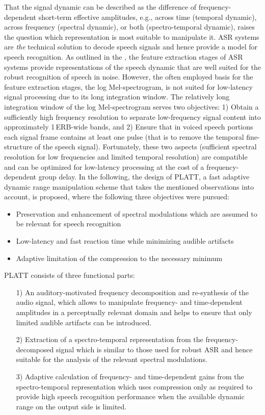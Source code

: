 \documentclass[10pt,a4paper,twocolumn]{article}
\begin{document}
That the signal dynamic can be described as the difference of frequency-dependent short-term effective amplitudes, e.g., across time (temporal dynamic), across frequency (spectral dynamic), or both (spectro-temporal dynamic), raises the question which representation is most suitable to manipulate it.
%
ASR systems are \emph{the} technical solution to decode speech signals and hence provide a model for speech recognition.
%
As outlined in the , the feature extraction stages of ASR systems provide representations of the speech dynamic that are well suited for the robust recognition of speech in noise.
%
However, the often employed basis for the feature extraction stages, the log Mel-spectrogram, is not suited for low-latency signal processing due to its long integration window.
%
The relatively long integration window of the log Mel-spectrogram serves two objectives: 1) Obtain a sufficiently high frequency resolution to separate low-frequency signal content into approximately 1\,ERB-wide bands, and 2) Ensure that in voiced speech portions each signal frame contains at least one pulse (that is to remove the temporal fine-structure of the speech signal).
%
Fortunately, these two aspects (sufficient spectral resolution for low frequencies and limited temporal resolution) are compatible and can be optimized for low-latency processing at the cost of a frequency-dependent group delay.
%
In the following, the design of PLATT, a fast adaptive dynamic range manipulation scheme that takes the mentioned observations into account, is proposed, where the following three objectives were pursued:
\begin{itemize}
	\item Preservation and enhancement of spectral modulations which are assumed to be relevant for speech recognition
	\item Low-latency and fast reaction time while minimizing audible artifacts
	\item Adaptive limitation of the compression to the necessary minimum
\end{itemize}
%
PLATT consists of three functional parts:
\begin{itemize}
	\item[1)] An auditory-motivated frequency decomposition and re-synthesis of the audio signal, which allows to manipulate frequency- and time-dependent amplitudes in a perceptually relevant domain and helps to ensure that only limited audible artifacts can be introduced.
	\item[2)] Extraction of a spectro-temporal representation from the frequency-decomposed signal which is similar to those used for robust ASR and hence suitable for the analysis of the relevant spectral modulations.
	\item[3)] Adaptive calculation of frequency- and time-dependent gains from the spectro-temporal representation which uses compression only as required to provide high speech recognition performance when the available dynamic range on the output side is limited.
\end{itemize}
\end{document}
